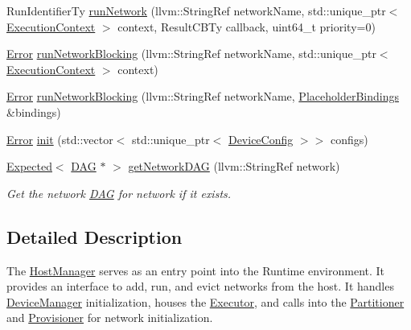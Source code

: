 \begin{DoxyCompactItemize}
Run\+Identifier\+Ty \hyperlink{classglow_1_1runtime_1_1_host_manager_a40bb5ba6c62b6697e306519271b3b936}{run\+Network} (llvm\+::\+String\+Ref network\+Name, std\+::unique\+\_\+ptr$<$ \hyperlink{classglow_1_1_execution_context}{Execution\+Context} $>$ context, Result\+C\+B\+Ty callback, uint64\+\_\+t priority=0)
\item 
\hyperlink{namespaceglow_afdb176c3a672ef66db0ecfc19a8d39bf}{Error} \hyperlink{classglow_1_1runtime_1_1_host_manager_a6e65b0b9577ab3573121fd5875514da1}{run\+Network\+Blocking} (llvm\+::\+String\+Ref network\+Name, std\+::unique\+\_\+ptr$<$ \hyperlink{classglow_1_1_execution_context}{Execution\+Context} $>$ context)
\item 
\hyperlink{namespaceglow_afdb176c3a672ef66db0ecfc19a8d39bf}{Error} \hyperlink{classglow_1_1runtime_1_1_host_manager_a0d6086ba220183342de461d500d6dde4}{run\+Network\+Blocking} (llvm\+::\+String\+Ref network\+Name, \hyperlink{classglow_1_1_placeholder_bindings}{Placeholder\+Bindings} \&bindings)
\item 
\hyperlink{namespaceglow_afdb176c3a672ef66db0ecfc19a8d39bf}{Error} \hyperlink{classglow_1_1runtime_1_1_host_manager_aa074ead90b05d6cd00b82b83f142c141}{init} (std\+::vector$<$ std\+::unique\+\_\+ptr$<$ \hyperlink{structglow_1_1runtime_1_1_device_config}{Device\+Config} $>$$>$ configs)
\item 
\mbox{\label{classglow_1_1runtime_1_1_host_manager_a91c85ef9c53652c7b470cf9e7876c4f0}} 
\hyperlink{classglow_1_1detail_1_1_glow_expected}{Expected}$<$ \hyperlink{structglow_1_1runtime_1_1_d_a_g}{D\+AG} $\ast$ $>$ \hyperlink{classglow_1_1runtime_1_1_host_manager_a91c85ef9c53652c7b470cf9e7876c4f0}{get\+Network\+D\+AG} (llvm\+::\+String\+Ref network)
\begin{DoxyCompactList}\small\item\em Get the network \hyperlink{structglow_1_1runtime_1_1_d_a_g}{D\+AG} for {\ttfamily network} if it exists. \end{DoxyCompactList}\end{DoxyCompactItemize}


\subsection{Detailed Description}
The \hyperlink{classglow_1_1runtime_1_1_host_manager}{Host\+Manager} serves as an entry point into the Runtime environment. It provides an interface to add, run, and evict networks from the host. It handles \hyperlink{classglow_1_1runtime_1_1_device_manager}{Device\+Manager} initialization, houses the \hyperlink{classglow_1_1runtime_1_1_executor}{Executor}, and calls into the \hyperlink{classglow_1_1_partitioner}{Partitioner} and \hyperlink{classglow_1_1runtime_1_1_provisioner}{Provisioner} for network initialization. 


